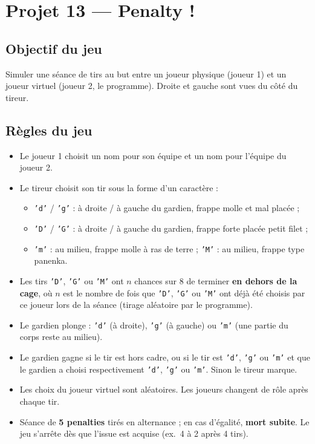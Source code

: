 \section{Projet 13 — Penalty !}
\setcounter{UPSTInumeroCahier des charges}{0}

\subsection*{Objectif du jeu}
Simuler une séance de tirs au but entre un joueur physique (joueur 1) et un joueur virtuel (joueur 2, le programme). Droite et gauche sont vues du côté du tireur.

\subsection*{Règles du jeu}
\begin{itemize}
  \item Le joueur 1 choisit un nom pour son équipe et un nom pour l'équipe du joueur 2.
  \item Le tireur choisit son tir sous la forme d'un caractère :
  \begin{itemize}
    \item \texttt{'d'} / \texttt{'g'} : à droite / à gauche du gardien, frappe molle et mal placée ;
    \item \texttt{'D'} / \texttt{'G'} : à droite / à gauche du gardien, frappe forte placée petit filet ;
    \item \texttt{'m'} : au milieu, frappe molle à ras de terre ; \texttt{'M'} : au milieu, frappe type panenka.
  \end{itemize}
  \item Les tirs \texttt{'D'}, \texttt{'G'} ou \texttt{'M'} ont $n$ chances sur 8 de terminer \textbf{en dehors de la cage}, où $n$ est le nombre de fois que \texttt{'D'}, \texttt{'G'} ou \texttt{'M'} ont déjà été choisis par ce joueur lors de la séance (tirage aléatoire par le programme).
  \item Le gardien plonge : \texttt{'d'} (à droite), \texttt{'g'} (à gauche) ou \texttt{'m'} (une partie du corps reste au milieu).
  \item Le gardien gagne si le tir est hors cadre, ou si le tir est \texttt{'d'}, \texttt{'g'} ou \texttt{'m'} et que le gardien a choisi respectivement \texttt{'d'}, \texttt{'g'} ou \texttt{'m'}. Sinon le tireur marque.
  \item Les choix du joueur virtuel sont aléatoires. Les joueurs changent de rôle après chaque tir.
  \item Séance de \textbf{5 penalties} tirés en alternance ; en cas d'égalité, \textbf{mort subite}. Le jeu s'arrête dès que l'issue est acquise (ex.\ 4 à 2 après 4 tirs).
\end{itemize}

